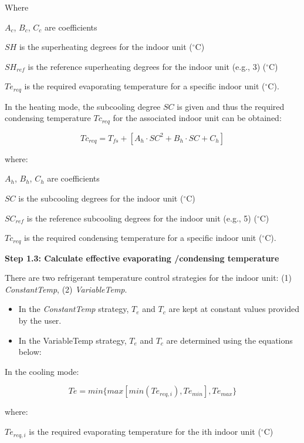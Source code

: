 Where

$A_c$, $B_c$, $C_c$ are coefficients

$SH$ is the superheating degrees for the indoor unit (\(^{\circ}\)C)

$SH_{ref}$ is the reference superheating degrees for the indoor unit (e.g., 3) (\(^{\circ}\)C)

$Te_{req}$ is the required evaporating temperature for a specific indoor unit (\(^{\circ}\)C).

In the heating mode, the subcooling degree $SC$ is given and thus the required condensing temperature $Tc_{req}$ for the associated indoor unit can be obtained:

\begin{equation}
  Tc_{req}=T_{fs}+[A_h\cdot SC^2+B_h\cdot SC+C_h]
\end{equation}

where:

$A_h$, $B_h$, $C_h$ are coefficients

$SC$ is the subcooling degrees for the indoor unit (\(^{\circ}\)C)

$SC_{ref}$ is the reference subcooling degrees for the indoor unit (e.g., 5) (\(^{\circ}\)C)

$Tc_{req}$ is the required condensing temperature for a specific indoor unit (\(^{\circ}\)C).

\textbf{Step 1.3: Calculate effective evaporating /condensing temperature}

There are two refrigerant temperature control strategies for the indoor unit: (1) \emph{ConstantTemp}, (2) \emph{VariableTemp}.

\begin{itemize}
  \item
    In the \emph{ConstantTemp} strategy, $T_e$ and $T_c$ are kept at constant values provided by the user.

 \item
   In the {VariableTemp} strategy, $T_e$ and $T_c$ are determined using the equations below:
\end{itemize}

In the cooling mode:

\begin{equation}
  Te = min \{ max [ min(Te_{req,i}), Te_{min}], Te_{max}\}
\end{equation}

where:

$Te_{req,i}$ is the required evaporating temperature for the ith indoor unit (\(^{\circ}\)C)

